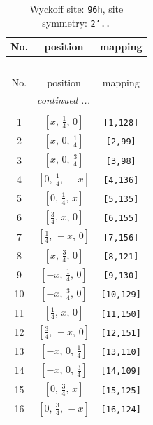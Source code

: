 \documentclass[fleqn,8pt]{jsarticle}
\begin{document}
\begin{longtable}{ccc}
\caption{Wyckoff site: {\tt 96h}, site symmetry: {\tt 2'..}}
 \\
 \hline \hline
No. & position & mapping \\ \hline \endfirsthead

\multicolumn{2}{l}{\tablename\ \thetable{}} \\
 \hline \hline
No. & position & mapping \\ \hline \endhead

 \hline \hline
\multicolumn{2}{r}{\footnotesize\it continued ...} \\ \endfoot

 \hline \hline
\multicolumn{2}{r}{} \\ \endlastfoot

1 & $\left[ x,\, \frac{1}{4},\, 0 \right]$ & {\tt [1,128]} \\ \hline
2 & $\left[ x,\, 0,\, \frac{1}{4} \right]$ & {\tt [2,99]} \\ \hline
3 & $\left[ x,\, 0,\, \frac{3}{4} \right]$ & {\tt [3,98]} \\ \hline
4 & $\left[ 0,\, \frac{1}{4},\, - x \right]$ & {\tt [4,136]} \\ \hline
5 & $\left[ 0,\, \frac{1}{4},\, x \right]$ & {\tt [5,135]} \\ \hline
6 & $\left[ \frac{3}{4},\, x,\, 0 \right]$ & {\tt [6,155]} \\ \hline
7 & $\left[ \frac{1}{4},\, - x,\, 0 \right]$ & {\tt [7,156]} \\ \hline
8 & $\left[ x,\, \frac{3}{4},\, 0 \right]$ & {\tt [8,121]} \\ \hline
9 & $\left[ - x,\, \frac{1}{4},\, 0 \right]$ & {\tt [9,130]} \\ \hline
10 & $\left[ - x,\, \frac{3}{4},\, 0 \right]$ & {\tt [10,129]} \\ \hline
11 & $\left[ \frac{1}{4},\, x,\, 0 \right]$ & {\tt [11,150]} \\ \hline
12 & $\left[ \frac{3}{4},\, - x,\, 0 \right]$ & {\tt [12,151]} \\ \hline
13 & $\left[ - x,\, 0,\, \frac{1}{4} \right]$ & {\tt [13,110]} \\ \hline
14 & $\left[ - x,\, 0,\, \frac{3}{4} \right]$ & {\tt [14,109]} \\ \hline
15 & $\left[ 0,\, \frac{3}{4},\, x \right]$ & {\tt [15,125]} \\ \hline
16 & $\left[ 0,\, \frac{3}{4},\, - x \right]$ & {\tt [16,124]} \\ \hline

\end{longtable}
\end{document}

